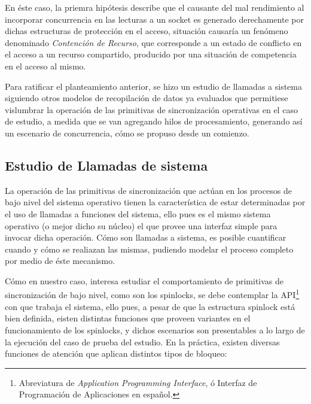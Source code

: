 En éste caso, la priemra hipótesis describe que el causante del mal rendimiento al incorporar concurrencia en las lecturas a un socket es generado derechamente por dichas estructuras de protección en el acceso, situación causaría un fenómeno denominado \emph{Contención de Recurso}, que corresponde a un estado de conflicto en el acceso a un recurso compartido, producido por una situación de competencia en el acceso al mismo.

Para ratificar el planteamiento anterior, se hizo un estudio de llamadas a sistema siguiendo otros modelos de recopilación de datos ya evaluados \cite{slides:hpPerf} que permitiese vislumbrar la operación de las primitivas de sincronización operativas en el caso de estudio, a medida que se van agregando hilos de procesamiento, generando así un escenario de concurrencia, cómo se propuso desde un comienzo.

\subsection{Estudio de Llamadas de sistema}

La operación de las primitivas de sincronización que actúan en los procesos de bajo nivel del sistema operativo tienen la característica de estar determinadas por el uso de llamadas a funciones del sistema, ello pues es el mismo sistema operativo (o mejor dicho su núcleo) el que provee una interfaz simple para invocar dicha operación. Cómo son llamadas a sistema, es posible cuantificar cuando y cómo se realiazan las mismas, pudiendo modelar el proceso completo por medio de éste mecanismo.

Cómo en nuestro caso, interesa estudiar el comportamiento de primitivas de sincronización de bajo nivel, como son los spinlocks, se debe contemplar la API\footnote{Abreviatura de \emph{Application Programming Interface}, ó Interfaz de Programación de Aplicaciones en español.} con que trabaja el sistema, ello pues, a pesar de que la estructura spinlock está bien definida, eisten distintas funciones que proveen variantes en el funcionamiento de los spinlocks, y dichos escenarios son presentables a lo largo de la ejecución del caso de prueba del estudio. En la práctica, existen diversas funciones de atención que aplican distintos tipos de bloqueo:

